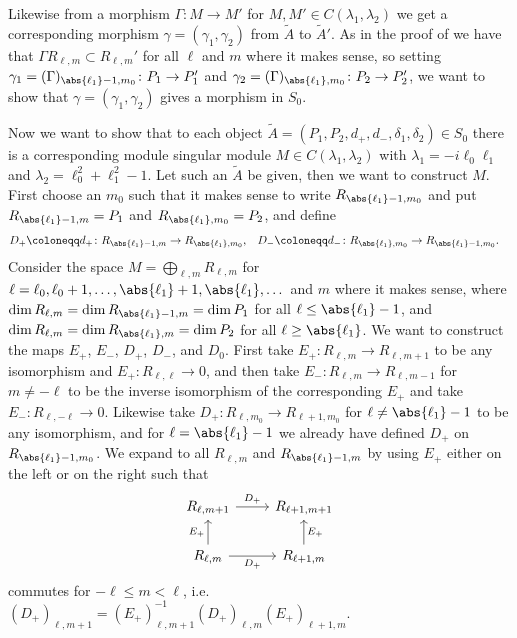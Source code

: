 Likewise from a morphism $\Gamma\colon M\to M'$ for $M,M'\in C(\lambda_1,\lambda_2)$ we get a corresponding morphism $\gamma=(\gamma_1,\gamma_2)$ from $\widetilde{A}$ to $\widetilde{A}'$. As in the proof of  we have that $\Gamma R_{\ell,m} \subset R_{\ell,m}'$ for all $\ell$ and $m$ where it makes sense, so setting $\gamma_1=(\Gamma)_{\abs{\ell_1}-1,m_0}\colon P_1\to P_1'$ and $\gamma_2 = (\Gamma)_{\abs{\ell_1},m_0}\colon P_2\to P_2'$, we want to show that $\gamma=(\gamma_1,\gamma_2)$ gives a morphism in $S_0$. 

Now we want to show that to each object $\widetilde{A}=(P_1,P_2,d_+,d_-,\delta_1,\delta_2)\in S_0$ there is a corresponding module singular module $M\in C(\lambda_1,\lambda_2)$ with $\lambda_1=-i\ell_0\ell_1$ and $\lambda_2=\ell_0^2+\ell_1^2-1$. Let such an $\widetilde{A}$ be given, then we want to construct $M$. First choose an $m_0$ such that it makes sense to write $R_{\abs{\ell_1}-1,m_0}$ and put $R_{\abs{\ell_1}-1,m}=P_1$ and $R_{\abs{\ell_1},m_0}=P_2$, and define
\begin{align*}
  D_+\coloneqq d_+\colon R_{\abs{\ell_1}-1,m}&\to R_{\abs{\ell_1},m_0}, & D_-\coloneqq d_-\colon R_{\abs{\ell_1},m_0} &\to R_{\abs{\ell_1}-1,m_0}.
\end{align*}
Consider the space $M=\bigoplus_{\ell,m}R_{\ell,m}$ for $\ell=\ell_0,\ell_0+1,\dotsc,\abs{\ell_1}+1,\abs{\ell_1},\dotsc$ and $m$ where it makes sense, where $\dim R_{\ell,m}=\dim R_{\abs{\ell_1}-1,m}=\dim P_1$ for all $\ell\leq \abs{\ell_1}-1$, and $\dim R_{\ell,m}=\dim R_{\abs{\ell_1},m}=\dim P_2$ for all $\ell\geq \abs{\ell_1}$. We want to construct the maps $E_+$, $E_-$, $D_+$, $D_-$, and $D_0$. First take $E_+\colon R_{\ell,m}\to R_{\ell,m+1}$ to be any isomorphism and $E_+\colon R_{\ell,\ell}\to 0$, and then take $E_-\colon R_{\ell,m}\to R_{\ell,m-1}$ for $m\neq -\ell$ to be the inverse isomorphism of the corresponding $E_+$ and take $E_-\colon R_{\ell,-\ell}\to 0$. Likewise take $D_+\colon R_{\ell,m_0}\to R_{\ell+1,m_0}$ for $\ell\neq \abs{\ell_1}-1$ to be any isomorphism, and for $\ell=\abs{\ell_1}-1$ we already have defined $D_+$ on $R_{\abs{\ell_1}-1,m_0}$. We expand to all $R_{\ell,m}$ and $R_{\abs{\ell_1}-1,m}$ by using $E_+$ either on the left or on the right such that
\[
  \begin{tikzcd}
    R_{\ell,m+1} \ar[r,"D_+"] & R_{\ell+1,m+1} \\
    R_{\ell,m}\ar[u,"E_+"] \ar[r,"D_+",swap] & R_{\ell+1,m}\ar[u,"E_+",swap]
  \end{tikzcd}
\]
commutes for $-\ell\leq m<\ell$, i.e.\ $(D_+)_{\ell,m+1}=(E_+)_{\ell,m+1}^{-1} (D_+)_{\ell,m} (E_+)_{\ell+1,m}$. 

